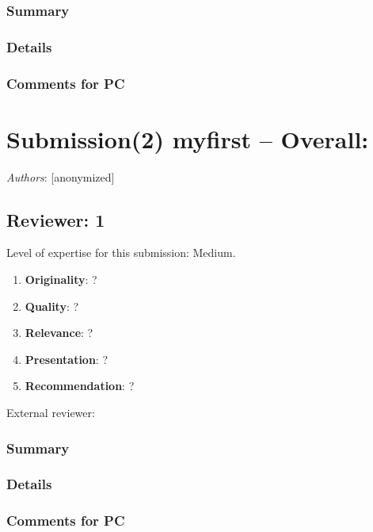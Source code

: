 \documentclass{article}
\begin{document}
   \subsubsection*{Summary}
   
      
   \subsubsection*{Details}
   

   \subsubsection*{Comments for PC}
   

 

\section{Submission(2) myfirst -- Overall: }  

\textit{Authors}: [anonymized]

     
 \subsection{Reviewer:  1 }
    
   Level of expertise for this submission: Medium.   
\begin{enumerate}
    
      \item \textbf{Originality}: ?
      \item \textbf{Quality}: ?
      \item \textbf{Relevance}: ?
      \item \textbf{Presentation}: ?
      \item \textbf{Recommendation}: ?
 \end{enumerate}
External reviewer:      
   \subsubsection*{Summary}
   
      
   \subsubsection*{Details}
   

   \subsubsection*{Comments for PC}
   
\end{document}
